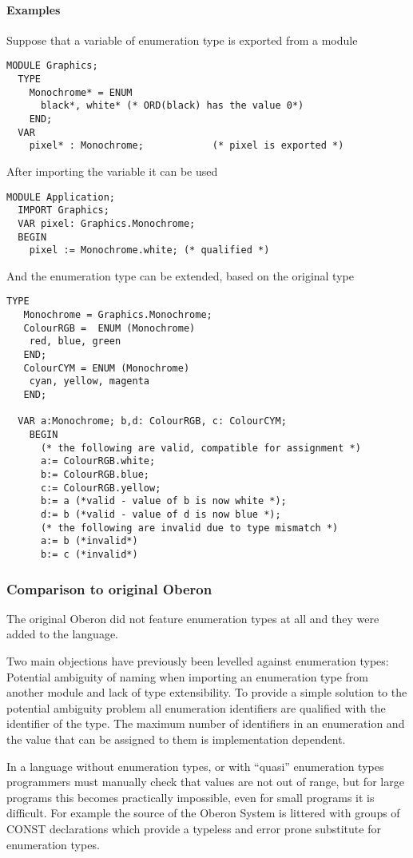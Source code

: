 \documentclass[a4wide,11pt]{article}
\begin{document}
\begin{annotation}
\paragraph{Examples}

Suppose that a variable of enumeration type is exported from a module

\begin{lstlisting}[style=example]
  MODULE Graphics;
  TYPE
    Monochrome* = ENUM
      black*, white* (* ORD(black) has the value 0*)
    END;
  VAR
    pixel* : Monochrome;            (* pixel is exported *)
\end{lstlisting}

After importing the variable it can be used

\begin{lstlisting}[style=example]
  MODULE Application;
  IMPORT Graphics;
  VAR pixel: Graphics.Monochrome;
  BEGIN
    pixel := Monochrome.white; (* qualified *)
\end{lstlisting}

And the enumeration type can be extended, based on the original type

\begin{lstlisting}[style=example]
  TYPE
   Monochrome = Graphics.Monochrome;
   ColourRGB =  ENUM (Monochrome)
   	red, blue, green
   END;
   ColourCYM = ENUM (Monochrome)
   	cyan, yellow, magenta
   END;

  VAR a:Monochrome; b,d: ColourRGB, c: ColourCYM;
    BEGIN
      (* the following are valid, compatible for assignment *)
      a:= ColourRGB.white;
      b:= ColourRGB.blue;
      c:= ColourRGB.yellow;
      b:= a (*valid - value of b is now white *);
      d:= b (*valid - value of d is now blue *);
      (* the following are invalid due to type mismatch *)
      a:= b (*invalid*)
      b:= c (*invalid*)
\end{lstlisting}

\subsubsection{Comparison to original Oberon}
The original Oberon did not feature enumeration types at all and they were added to the language.

Two main objections have previously been levelled against enumeration types:
Potential ambiguity of naming when importing an enumeration type from another module and lack of type extensibility.
To provide a simple solution to the potential ambiguity problem all enumeration identifiers are qualified with the identifier of the type.
The maximum number of identifiers in an enumeration and the value that can be assigned to them is implementation dependent.

In a language without enumeration types, or with “quasi” enumeration types programmers must manually check that values are not out of range, but for large programs this becomes practically impossible, even for small programs it is difficult.
For example the source of the Oberon System is littered with groups of CONST declarations which provide a typeless and error prone substitute for enumeration types.
\end{annotation}
\end{document}
